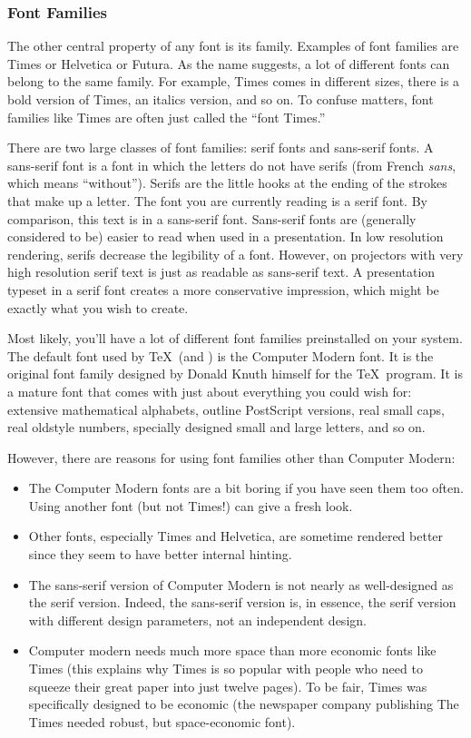 \subsubsection{Font Families}
\label{section-guidelines-serif}

The other central property of any font is its family. Examples of font families are Times or Helvetica or Futura. As the name suggests, a lot of different fonts can belong to the same family. For example, Times comes in different sizes, there is a bold version of Times, an italics version, and so on. To confuse matters, font families like Times are often just called the ``font Times.''

There are two large classes of font families: serif fonts and sans-serif fonts. A sans-serif font is a font in which the letters do not have serifs (from French \emph{sans}, which means ``without''). Serifs are the little hooks at the ending of the strokes that make up a letter. The font you are currently reading is a serif font. \textsf{By comparison, this text is in a sans-serif font.} Sans-serif fonts are (generally considered to be) easier to read when used in a presentation. In low resolution rendering, serifs decrease the legibility of a font. However, on projectors with very high resolution serif text is just as readable as sans-serif text. A presentation typeset in a serif font creates a more conservative impression, which might be exactly what you wish to create.

Most likely, you'll have a lot of different font families preinstalled on your system. The default font used by \TeX\ (and \beamer) is the Computer Modern font. It  is the original font family designed by Donald Knuth himself for the \TeX\ program. It is a mature font that comes with just about everything you could wish for: extensive mathematical alphabets, outline PostScript versions, real small caps, real oldstyle numbers, specially designed small and large letters, and so on.

However, there are reasons for using font families other than Computer Modern:
\begin{itemize}
\item
  The Computer Modern fonts are a bit boring if you have seen them too often. Using another font (but not Times!) can give a fresh look.
\item
  Other fonts, especially Times and Helvetica, are sometime rendered better since they seem to have better internal hinting.
\item
  The sans-serif version of Computer Modern is not nearly as well-designed as the serif version. Indeed, the sans-serif version is, in essence, the serif version with different design parameters, not an independent design.
\item
  Computer modern needs much more space than more economic fonts like Times (this explains why Times is so popular with people who need to squeeze their great paper into just twelve pages). To be fair, Times was specifically designed to be economic (the newspaper company publishing The Times needed robust, but space-economic font).
\end{itemize}

